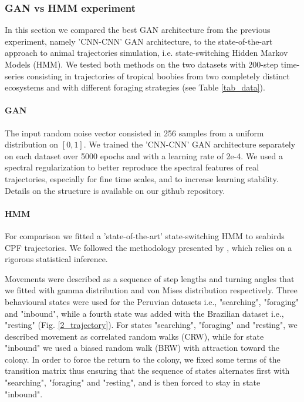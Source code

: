 \documentclass{article}
\begin{document}
\subsubsection{GAN vs HMM experiment}
In this section we compared the best GAN architecture from the previous experiment, namely 'CNN-CNN' GAN architecture, to the state-of-the-art approach to animal trajectories simulation, i.e. state-switching Hidden Markov Models (HMM). We tested both methods on the two datasets with 200-step time-series consisting in trajectories of tropical boobies from two completely distinct ecosystems and with different foraging strategies (see Table \ref{tab_data}).

\paragraph{GAN}
The input random noise vector consisted in 256 samples from a uniform distribution on $[0, 1]$. We trained the 'CNN-CNN' GAN architecture separately on each dataset over 5000 epochs and with a learning rate of 2e-4. We used a spectral regularization to better reproduce the spectral features of real trajectories, especially for fine time scales, and to increase learning stability. Details on the structure is available on our github repository\footnotemark[1].

\paragraph{HMM}
For comparison we fitted a 'state-of-the-art' state-switching HMM to seabirds CPF trajectories. We followed the methodology presented by \citep{michelot_estimation_2017}, which relies on a rigorous statistical inference.

Movements were described as a sequence of step lengths and turning angles that we fitted with gamma distribution and von Mises distribution respectively. Three behavioural states were used for the Peruvian datasets i.e., "searching", "foraging" and "inbound", while a fourth state was added with the Brazilian dataset i.e., "resting" (Fig. \ref{2_trajectory}). For states "searching", "foraging" and "resting", we described movement as correlated random walks (CRW), while for state "inbound" we used a biased random walk (BRW) with attraction toward the colony. In order to force the return to the colony, we fixed some terms of the transition matrix thus ensuring that the sequence of states alternates first with "searching", "foraging" and "resting", and is then forced to stay in state "inbound". 
\end{document}
